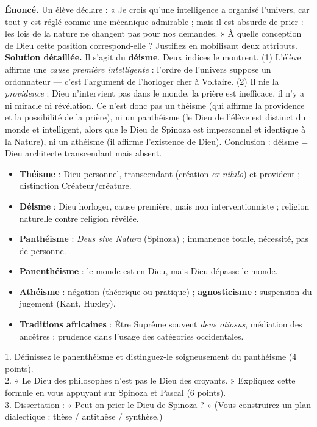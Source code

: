 \documentclass[11pt]{article}
\begin{document}
\begin{exoresolu}
\textbf{Énoncé.} Un élève déclare : « Je crois qu'une intelligence a organisé l'univers, car tout y est réglé comme une mécanique admirable ; mais il est absurde de prier : les lois de la nature ne changent pas pour nos demandes. » À quelle conception de Dieu cette position correspond-elle ? Justifiez en mobilisant deux attributs.
\tcblower
\textbf{Solution détaillée.} Il s'agit du \textbf{déisme}. Deux indices le montrent. (1) L'élève affirme une \emph{cause première intelligente} : l'ordre de l'univers suppose un ordonnateur — c'est l'argument de l'horloger cher à Voltaire. (2) Il nie la \emph{providence} : Dieu n'intervient pas dans le monde, la prière est inefficace, il n'y a ni miracle ni révélation. Ce n'est donc pas un théisme (qui affirme la providence et la possibilité de la prière), ni un panthéisme (le Dieu de l'élève est distinct du monde et intelligent, alors que le Dieu de Spinoza est impersonnel et identique à la Nature), ni un athéisme (il affirme l'existence de Dieu). Conclusion : déisme = Dieu architecte transcendant mais absent.
\end{exoresolu}

\begin{aretenir}
\begin{itemize}
\item \textbf{Théisme} : Dieu personnel, transcendant (création \emph{ex nihilo}) et provident ; distinction Créateur/créature.
\item \textbf{Déisme} : Dieu horloger, cause première, mais non interventionniste ; religion naturelle contre religion révélée.
\item \textbf{Panthéisme} : \emph{Deus sive Natura} (Spinoza) ; immanence totale, nécessité, pas de personne.
\item \textbf{Panenthéisme} : le monde est en Dieu, mais Dieu dépasse le monde.
\item \textbf{Athéisme} : négation (théorique ou pratique) ; \textbf{agnosticisme} : suspension du jugement (Kant, Huxley).
\item \textbf{Traditions africaines} : Être Suprême souvent \emph{deus otiosus}, médiation des ancêtres ; prudence dans l'usage des catégories occidentales.
\end{itemize}
\end{aretenir}

\begin{exercice}
1. Définissez le panenthéisme et distinguez-le soigneusement du panthéisme (4 points).\\
2. « Le Dieu des philosophes n'est pas le Dieu des croyants. » Expliquez cette formule en vous appuyant sur Spinoza et Pascal (6 points).\\
3. Dissertation : « Peut-on prier le Dieu de Spinoza ? » (Vous construirez un plan dialectique : thèse / antithèse / synthèse.)
\end{exercice}
\end{document}
